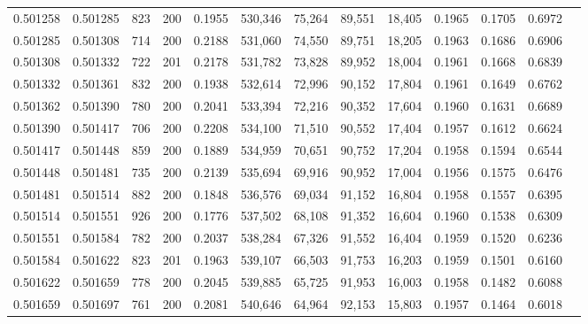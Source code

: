 \begin{tabular}{rrrrrrrrrrrrr}
0.501258 & 0.501285 &   823 & 200 &                                     0.1955 & 530,346 &  75,264 &  89,551 &  18,405 & 0.1965 & 0.1705 & 0.6972 \\
0.501285 & 0.501308 &   714 & 200 &                                     0.2188 & 531,060 &  74,550 &  89,751 &  18,205 & 0.1963 & 0.1686 & 0.6906 \\
0.501308 & 0.501332 &   722 & 201 &                                     0.2178 & 531,782 &  73,828 &  89,952 &  18,004 & 0.1961 & 0.1668 & 0.6839 \\
0.501332 & 0.501361 &   832 & 200 &                                     0.1938 & 532,614 &  72,996 &  90,152 &  17,804 & 0.1961 & 0.1649 & 0.6762 \\
0.501362 & 0.501390 &   780 & 200 &                                     0.2041 & 533,394 &  72,216 &  90,352 &  17,604 & 0.1960 & 0.1631 & 0.6689 \\
0.501390 & 0.501417 &   706 & 200 &                                     0.2208 & 534,100 &  71,510 &  90,552 &  17,404 & 0.1957 & 0.1612 & 0.6624 \\
0.501417 & 0.501448 &   859 & 200 &                                     0.1889 & 534,959 &  70,651 &  90,752 &  17,204 & 0.1958 & 0.1594 & 0.6544 \\
0.501448 & 0.501481 &   735 & 200 &                                     0.2139 & 535,694 &  69,916 &  90,952 &  17,004 & 0.1956 & 0.1575 & 0.6476 \\
0.501481 & 0.501514 &   882 & 200 &                                     0.1848 & 536,576 &  69,034 &  91,152 &  16,804 & 0.1958 & 0.1557 & 0.6395 \\
0.501514 & 0.501551 &   926 & 200 &                                     0.1776 & 537,502 &  68,108 &  91,352 &  16,604 & 0.1960 & 0.1538 & 0.6309 \\
0.501551 & 0.501584 &   782 & 200 &                                     0.2037 & 538,284 &  67,326 &  91,552 &  16,404 & 0.1959 & 0.1520 & 0.6236 \\
0.501584 & 0.501622 &   823 & 201 &                                     0.1963 & 539,107 &  66,503 &  91,753 &  16,203 & 0.1959 & 0.1501 & 0.6160 \\
0.501622 & 0.501659 &   778 & 200 &                                     0.2045 & 539,885 &  65,725 &  91,953 &  16,003 & 0.1958 & 0.1482 & 0.6088 \\
0.501659 & 0.501697 &   761 & 200 &                                     0.2081 & 540,646 &  64,964 &  92,153 &  15,803 & 0.1957 & 0.1464 & 0.6018 \\

\end{tabular}
